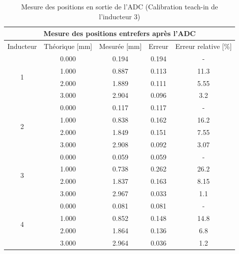 \begin{table}[H]
    \centering
    \begin{tabular}{|c|c|c|c|c|}
        \hline
        \multicolumn{5}{|c|}{\textbf{Mesure des positions entrefers après l'ADC}}                      \\ \hline
        Inducteur          & Théorique {[}mm{]} & Mesurée {[}mm{]} & Erreur & Erreur relative {[}\%{]} \\ \hline
        \multirow{4}{*}{1} & 0.000              & 0.194            & 0.194  & -                        \\ \cline{2-5}
                           & 1.000              & 0.887            & 0.113  & 11.3                     \\ \cline{2-5}
                           & 2.000              & 1.889            & 0.111  & 5.55                     \\ \cline{2-5}
                           & 3.000              & 2.904            & 0.096  & 3.2                      \\ \hline
        \multirow{4}{*}{2} & 0.000              & 0.117            & 0.117  & -                        \\ \cline{2-5}
                           & 1.000              & 0.838            & 0.162  & 16.2                     \\ \cline{2-5}
                           & 2.000              & 1.849            & 0.151  & 7.55                     \\ \cline{2-5}
                           & 3.000              & 2.908            & 0.092  & 3.07                     \\ \hline
        \multirow{4}{*}{3} & 0.000              & 0.059            & 0.059  & -                        \\ \cline{2-5}
                           & 1.000              & 0.738            & 0.262  & 26.2                     \\ \cline{2-5}
                           & 2.000              & 1.837            & 0.163  & 8.15                     \\ \cline{2-5}
                           & 3.000              & 2.967            & 0.033  & 1.1                      \\ \hline
        \multirow{4}{*}{4} & 0.000              & 0.081            & 0.081  & -                        \\ \cline{2-5}
                           & 1.000              & 0.852            & 0.148  & 14.8                     \\ \cline{2-5}
                           & 2.000              & 1.864            & 0.136  & 6.8                      \\ \cline{2-5}
                           & 3.000              & 2.964            & 0.036  & 1.2                      \\ \hline
    \end{tabular}
    \caption{Mesure des positions en sortie de l'ADC (Calibration teach-in de l'inducteur 3)}
    \label{tab:teachin_3_adc}
\end{table}

